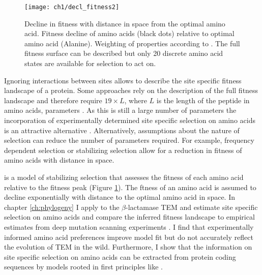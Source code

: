 \singlespacing
\begin{figure}
     \centering
	\texttt{[image: ch1/decl\_fitness2]}
	\caption{Decline in fitness with distance in \PC space from the optimal amino acid. 
	Fitness decline of amino acids (black dots) relative to optimal amino acid (Alanine). Weighting of \PC properties according to \citet{grantham1974}.
	The full fitness surface can be described but only 20 discrete amino acid states are available for selection to act on.}
	\label{fig:decl_fit}
\end{figure}
\doublespacing

Ignoring interactions between sites allows to describe the site specific fitness landscape of a protein.
Some approaches rely on the description of the full fitness landscape and therefore require $19 \times L$, where $L$ is the length of the peptide in amino acids, parameters \citep{LartillotAndPhilippe2004,le2008,wang2008,holder2008,wu2013,tamuri2014}.
As this is still a large number of parameters the incorporation of experimentally determined site specific selection on amino acids is an attractive alternative \citep{bloom2014, thyagarajan2014, bloom2017}. 
Alternatively, assumptions about the nature of selection can reduce the number of parameters required.
For example, frequency dependent selection \citep{GoldmanAndYang1994, MuseAndGaut1994, thorne1996} or stabilizing selection \citep{beaulieu2019} allow for a reduction in fitness of amino acids with distance in \PC space.

\selac \citep{beaulieu2019} is a model of stabilizing selection that assesses the fitness of each amino acid relative to the fitness peak (Figure \ref{fig:decl_fit}).
The ftness of an amino acid is assumed to decline exponentially with distance to the optimal amino acid in \PC space.
In chapter \ref{ch:phylogeny} I apply \selac to the $\beta$-lactamase TEM and estimate site specific selection on amino acids and compare the inferred fitness landscape to empirical estimates from deep mutation scanning experiments \citep{stiffler2016}.
I find that experimentally informed amino acid preferences improve model fit but do not accurately reflect the evolution of TEM in the wild.
Furthermore, I show that the information on site specific selection on amino acids can be extracted from protein coding sequences by models rooted in first principles like \selac.




